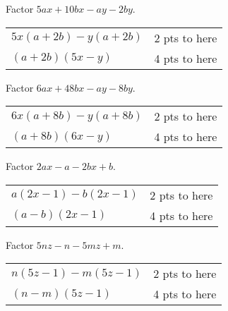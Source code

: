 {
	Factor $5ax+10bx-ay-2by$.
}
{
	\begin{tabular}{l r}
	$5x(a+2b)-y(a+2b)$ & 2 pts to here\\
	$(a+2b)(5x-y)$ & 4 pts to here
	\end{tabular}
}

{
	Factor $6ax+48bx-ay-8by$.
}
{
	\begin{tabular}{l r}
	$6x(a+8b)-y(a+8b)$ & 2 pts to here\\
	$(a+8b)(6x-y)$ & 4 pts to here
	\end{tabular}
}

{
	Factor $2ax-a-2bx+b$.
}
{
	\begin{tabular}{l r}
	$a(2x-1)-b(2x-1)$  &  2 pts to here\\
	$(a-b)(2x-1)$	&  4 pts to here
	\end{tabular}
}

{
	Factor $5nz-n-5mz+m$.
}
{
	\begin{tabular}{l r}
	$n(5z-1)-m(5z-1)$ & 2 pts to here\\
	$(n-m)(5z-1)$  & 4 pts to here
	\end{tabular}
}
